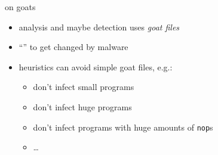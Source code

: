 
\begin{frame}{on goats}
    \begin{itemize}
    \item analysis and maybe detection uses \textit{goat files}
    \item ``'' to get changed by malware
    \item heuristics can avoid simple goat files, e.g.:
        \begin{itemize}
        \item don't infect small programs
        \item don't infect huge programs
        \item don't infect programs with huge amounts of {\tt nop}s
        \item \ldots
        \end{itemize}
    \end{itemize}
\end{frame}



